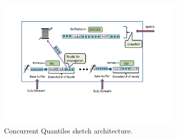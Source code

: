 \begin{figure}[tb]
    \centering
    \includegraphics[width=3.5in]{images/cocurrentQuntiles.pdf}
    \caption{Concurrent Quantiles sketch architecture.}
    \label{cocurrentQuntiles}
\end{figure}


